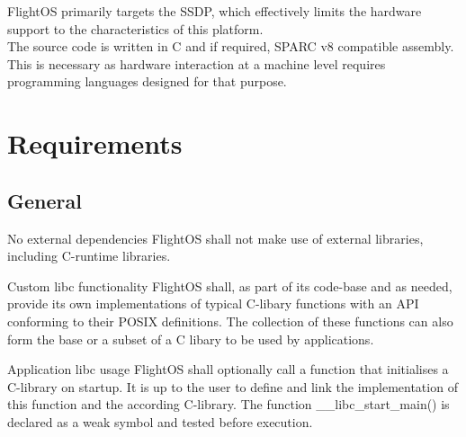 FlightOS primarily targets the \gls{SSDP}, which effectively limits the hardware
support to the characteristics of this platform. \\
\noindent
The source code is written in C and if required, \gls{SPARC} v8 compatible
assembly. This is necessary as hardware interaction at a machine level requires
programming languages designed for that purpose.



\chapter{Requirements}

\section{General}


 {No external dependencies}{%
FlightOS shall not make use of external libraries, including C-runtime libraries.
}{}%

 {Custom libc functionality}{%
FlightOS shall, as part of its code-base and as needed, provide its own
implementations of typical C-libary functions with an \gls{API} conforming to
their \gls{POSIX} definitions.
}{%
The collection of these functions can also form the base or a subset of a
C libary to be used by applications.}%

 {Application libc usage}{%
FlightOS shall optionally call a function that initialises a C-library on startup.
It is up to the user to define and link the implementation of this function and
the according C-library.
}{%
The function \_\_libc\_start\_main() is declared as a weak symbol and tested
before execution.
}%


%
%
%
%

